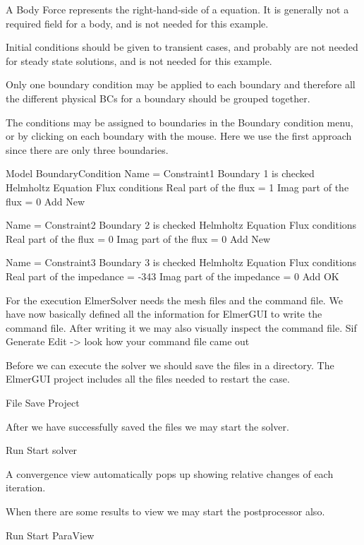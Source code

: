 A Body Force represents the right-hand-side of a equation. It is generally not a required field for a body, and is not needed for this example.

Initial conditions should be given to transient cases, and probably are not needed for steady state solutions, and is not needed for this example.

Only one boundary condition may be applied to each boundary and therefore all the different physical BCs for a boundary should be grouped together. 

The conditions may be assigned to boundaries in the Boundary condition menu, or by clicking on each boundary with the mouse. Here we use the first approach since there are only three boundaries.

\ttbegin
Model
  BoundaryCondition
    Name = Constraint1
    Boundary 1 is checked
    Helmholtz Equation
      Flux conditions
        Real part of the flux = 1
        Imag part of the flux = 0
    Add
    New

    Name = Constraint2
    Boundary 2 is checked
    Helmholtz Equation
      Flux conditions
        Real part of the flux = 0
        Imag part of the flux = 0
    Add
    New

    Name = Constraint3
    Boundary 3 is checked
    Helmholtz Equation
      Flux conditions
        Real part of the impedance = -343
        Imag part of the impedance = 0
    Add
   OK 
\ttend   

For the execution ElmerSolver needs the mesh files and the command file.  We have now basically defined all the information for ElmerGUI to write the command file. After writing it we may also visually inspect the command file.
\ttbegin
Sif 
  Generate
  Edit -> look how your command file came out  
\ttend

Before we can execute the solver we should save the files in a directory.  The ElmerGUI project includes all the files needed to restart the case.

\ttbegin
File 
  Save Project
\ttend

After we have successfully saved the files we may start the solver.

\ttbegin
Run
  Start solver
\ttend

A convergence view automatically pops up showing relative changes of each iteration.

When there are some results to view we may start the postprocessor also.

\ttbegin
Run
  Start ParaView
\ttend

